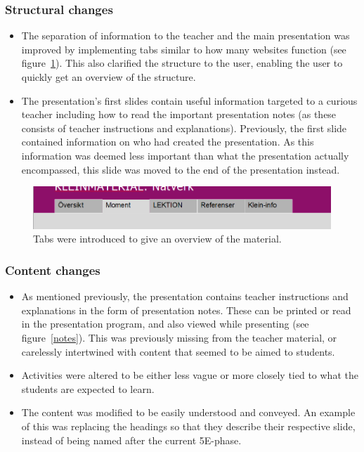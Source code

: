 \subsubsection*{Structural changes}
\begin{itemize}
    \item The separation of information to the teacher and the main presentation was improved by implementing tabs similar to how many websites function (see figure~\ref{tabs}). This also clarified the structure to the user, enabling the user to quickly get an overview of the structure.
    \item The presentation's first slides contain useful information targeted to a curious teacher including how to read the important presentation notes (as these consists of teacher instructions and explanations). Previously, the first slide contained information on who had created the presentation. As this information was deemed less important than what the presentation actually encompassed, this slide was moved to the end of the presentation instead.
\end{itemize}

\begin{figure}[H]
\centering
\includegraphics[width=\linewidth]{figure/tabs2.png}
\caption{Tabs were introduced to give an overview of the material.}
\label{tabs}
\end{figure}

\subsubsection*{Content changes}
\begin{itemize}
    \item As mentioned previously, the presentation contains teacher instructions and explanations in the form of presentation notes. These can be printed or read in the presentation program, and also viewed while presenting (see figure~\ref{notes}). This was previously missing from the teacher material, or carelessly intertwined with content that seemed to be aimed to students.
    \item Activities were altered to be either less vague or more closely tied to what the students are expected to learn.
    \item The content was modified to be easily understood and conveyed. An example of this was replacing the headings so that they describe their respective slide, instead of being named after the current 5E-phase.
\end{itemize}

